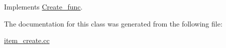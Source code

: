 Implements \mbox{\hyperlink{classCreate__func_a04aa802c4546f72d1c10db1983cece5b}{Create\+\_\+func}}.



The documentation for this class was generated from the following file\+:\begin{DoxyCompactItemize}
\item 
\mbox{\hyperlink{item__create_8cc}{item\+\_\+create.\+cc}}\end{DoxyCompactItemize}
